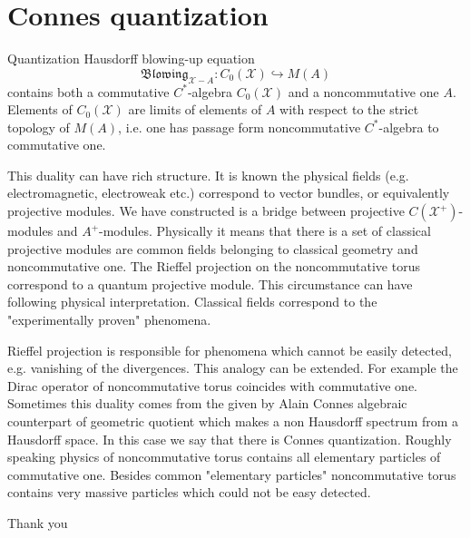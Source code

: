 \documentclass{beamer}
\theoremstyle{plain}
\newcommand{\be}{\begin{equation}}
\newcommand{\ee}{\end{equation}}
\newcommand{\sX}{\mathcal{X}}       %
\newcommand{\hookto}{\hookrightarrow}        %
\begin{document}
\section{Connes quantization}
\begin{frame}
 {\Large Quantization}
 Hausdorff blowing-up equation
\be\label{blowing_r_eqn}
\mathfrak {Blowing}_{\sX-A }:C_0\left( \sX\right) \hookto M\left(A \right)
\ee
contains both a commutative $C^*$-algebra $C_0\left( \sX\right)$ and  a noncommutative one $A$. Elements of  $C_0\left( \sX\right)$  are limits of elements of $A$ with respect to the strict topology of $M\left(A \right)$, i.e. one has passage form noncommutative $C^*$-algebra to commutative one.



 This duality can have rich structure. It is known the physical fields (e.g. electromagnetic, electroweak etc.) correspond to vector bundles, or equivalently projective modules. We have constructed is  a bridge between projective $C\left(\sX^+ \right)$-modules and  $A^+$-modules. Physically it means that there is a set of classical projective modules  are common fields belonging to classical geometry and noncommutative one. The Rieffel projection on the noncommutative torus  correspond to a quantum projective module. This circumstance can have following physical interpretation. Classical fields correspond  to the "experimentally  proven" phenomena.  
\end{frame}
\begin{frame}
Rieffel projection is responsible for phenomena which cannot be easily detected, e.g. vanishing of the divergences.  	This analogy can be extended. For example the Dirac operator of noncommutative torus coincides with commutative one.
Sometimes this duality comes from the given by Alain Connes  algebraic counterpart of geometric quotient  which makes a non Hausdorff spectrum from a Hausdorff space. In this case we say that there is  \alert{ Connes quantization}. Roughly speaking physics of noncommutative torus contains all elementary particles of commutative one. Besides common "elementary particles" noncommutative torus contains very massive particles which could not be easy detected.

	\end{frame}

\begin{frame}
	\alert{Thank you}
\end{frame}
\end{document}
